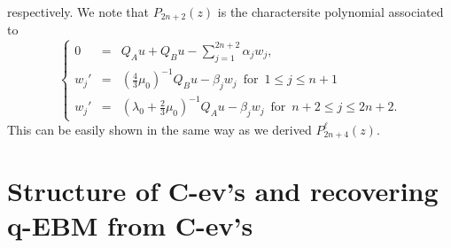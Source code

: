 \documentclass[a4paper,12pt]{article}
\newtheorem{a priori condition}[Th]{A priori condition}
\begin{document}
respectively. We note that $P_{2n+2}(z)$ is the charactersite polynomial associated to  
\begin{equation}\label{s4.16}
\left\{
\begin{array}{rcl}
0&=&Q_A u +Q_B u-  \sum_{j=1}^{2n+2} \alpha_jw_j,\\
w_j'&=&(\frac{4}{3}\mu_0)^{-1}Q_B u -\beta_jw_j\,\,\,\text{for}\,\,\, 1\leq j \leq n+1\\
w_j'&=&(\lambda_0+\frac{2}{3}\mu_0)^{-1}Q_A u -\beta_jw_j\,\,\,\text{for}\,\,\, n+2\leq j \leq 2n+2.
\end{array}
\right.
\end{equation}
This can be easily shown in the same way as we derived $P^\ell_{2n+4}(z)$. 






\section{Structure of C-ev's and recovering q-EBM from C-ev's}
\setcounter{equation}{0}
\end{document}
